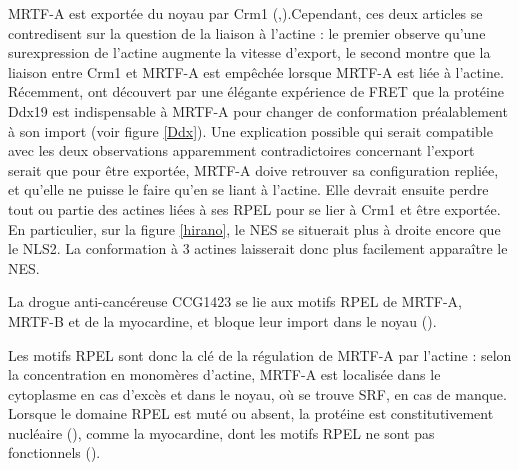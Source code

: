  MRTF-A est exportée du noyau par Crm1 (\cite{vartiainen_nuclear_2007},\cite{hayashi_differences_2013}).Cependant, ces deux articles se contredisent sur la question de la liaison à l'actine : le premier observe qu'une surexpression de l'actine augmente la vitesse d'export, le second montre que la liaison entre Crm1 et MRTF-A est empêchée lorsque MRTF-A est liée à l'actine. Récemment, \cite{rajakyla_rna_2015} ont découvert par une élégante expérience de FRET que la protéine Ddx19 est indispensable à MRTF-A pour changer de conformation préalablement à son import (voir figure \ref{Ddx}). Une explication possible qui serait compatible avec les deux observations apparemment contradictoires concernant l'export serait que pour être exportée, MRTF-A doive retrouver sa configuration repliée, et qu'elle ne puisse le faire qu'en se liant à l'actine. Elle devrait ensuite perdre tout ou partie des actines liées à ses RPEL pour se lier à Crm1 et être exportée. En particulier, sur la figure \ref{hirano}, le NES se situerait plus à droite encore que le NLS2. La conformation à 3 actines laisserait donc plus facilement apparaître le NES. 
 
 La drogue anti-cancéreuse CCG1423 se lie aux motifs RPEL de MRTF-A, MRTF-B et de la myocardine, et bloque leur import dans le noyau (\cite{hayashi_rpel_2014}). 
 
 Les motifs RPEL sont donc la clé de la régulation de MRTF-A par l'actine : selon la concentration en monomères d'actine, MRTF-A est localisée dans le cytoplasme en cas d'excès et dans le noyau, où se trouve SRF, en cas de manque. Lorsque le domaine RPEL est muté ou absent, la protéine est constitutivement nucléaire (\cite{miralles_actin_2003}), comme la myocardine, dont les motifs RPEL ne sont pas fonctionnels (\cite{guettler_rpel_2008}). 
 
